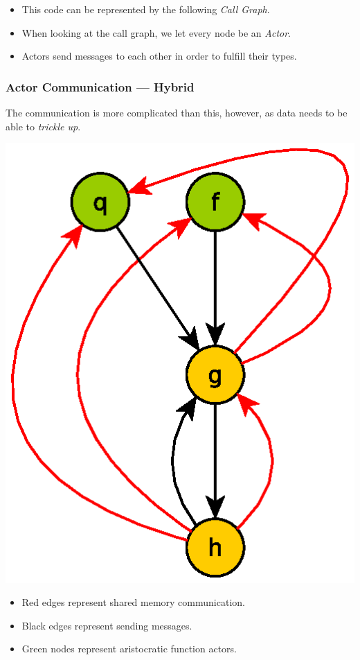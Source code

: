 \documentclass{beamer}
\begin{document}
\begin{frame}[fragile]
\begin{multicols}{2}
    \begin{itemize}
      \item This code can be represented by the following \emph{Call
          Graph}.
      \item  When looking at the call graph, we let every node be an 
        \emph{Actor}.
      \item Actors send messages to each other in order to fulfill
        their types. 
    \end{itemize}
  \end{multicols}
\end{frame}

\begin{frame}[fragile]
  \frametitle{Actor Communication --- Hybrid}

  The communication is more complicated than this, however, as data
  needs to be able to \emph{trickle up}.

  \begin{multicols}{2}
    \begin{center}
      \includegraphics[width=0.7\linewidth]{media/commtypes.eps}
    \end{center}

    \begin{itemize}
      \item {\color{red} Red edges} represent shared memory
        communication.
      \item  Black edges represent sending messages.
      \item {\color{green} Green nodes} represent aristocratic function
      actors.
    \end{itemize}
  \end{multicols}
\end{frame}
\end{document}
